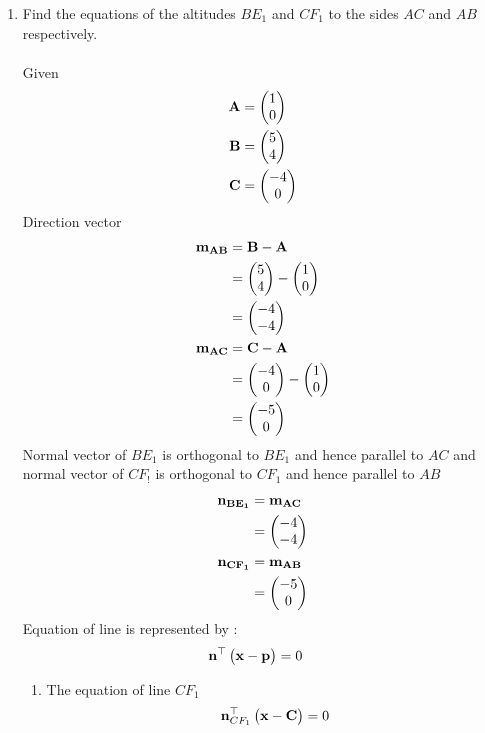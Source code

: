 \documentclass[11pt]{book}
\begin{document}
\begin{enumerate}[label=\thesection.\arabic*.,ref=\thesection.\theenumi]
\item Find the equations of the altitudes $BE_1$ and $CF_1$ to the sides $AC$ and $AB$ respectively. 
  \\    \\ \solution Given 
    \begin{align} 
 \mathbf{A} &= \begin{pmatrix} 1\\ 0 \end{pmatrix} \\ 
 \mathbf{B} &= \begin{pmatrix} 5\\ 4 \end{pmatrix}\\
 \mathbf{C} &= \begin{pmatrix} -4\\ 0\end{pmatrix}
 \end{align}
 Direction vector 
 \begin{align}
     \mathbf{m_{AB}}&=\mathbf{B}-\mathbf{A} \\
           &=\begin{pmatrix}5 \\ 4\end{pmatrix} -\begin{pmatrix}1 \\ 0\end{pmatrix}  \\
           &=\begin{pmatrix}-4 \\-4\end{pmatrix} \\
    \mathbf{ m_{AC}}&=\mathbf{C}-\mathbf{A} \\
     &=\begin{pmatrix}-4 \\ 0\end{pmatrix} -\begin{pmatrix}1 \\ 0\end{pmatrix}  \\
     &=\begin{pmatrix}-5 \\ 0\end{pmatrix} \\
 \end{align}
  Normal vector of $BE_1$ is orthogonal to $BE_1$  and hence parallel to $AC$ and normal vector of $CF_!$ is orthogonal to $CF_1$ and hence parallel to $AB$
  \begin{align}
      \mathbf{n_{BE_1}}&=\mathbf{m_{AC}}\\
      &=\begin{pmatrix}-4 \\ -4\end{pmatrix}\\
      \mathbf{n_{CF_1}}&=\mathbf{m_{AB}}\\
      &=\begin{pmatrix}-5 \\ 0\end{pmatrix}\\
  \end{align}
  Equation of line is represented by :
  \begin{align}
      \mathbf{n}^{\top}\begin{pmatrix}\mathbf{x}-\mathbf{p}\end{pmatrix}&=0
  \end{align}
  \begin{enumerate}
      \item The equation of line $CF_1$
      \begin{align}
          \vec{n}^{\top}_{CF_1}\myvec{\vec{x}-\vec{C}}&=0 \\

\end{align}
\end{enumerate}
\end{enumerate}
\end{document}
